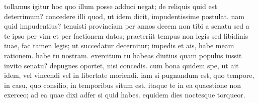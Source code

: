  tollamus igitur hoc quo illum posse adduci negat; de reliquis quid est deterrimum? concedere illi quod, ut idem dicit, impudentissime postulat. nam quid impudentius? tenuisti provinciam per annos decem non tibi a senatu sed a te ipso per vim et per factionem datos; praeteriit tempus non legis sed libidinis tuae, fac tamen legis; ut succedatur decernitur; impedis et ais, habe meam rationem. habe tu nostram. exercitum tu habeas diutius quam populus iussit invito senatu? depugnes oportet, nisi concedis. cum bona quidem spe, ut ait idem, vel vincendi vel in libertate moriendi. iam si pugnandum est, quo tempore, in casu, quo consilio, in temporibus situm est. itaque te in ea quaestione non exerceo; ad ea quae dixi adfer si quid habes. equidem dies noctesque torqueor.
